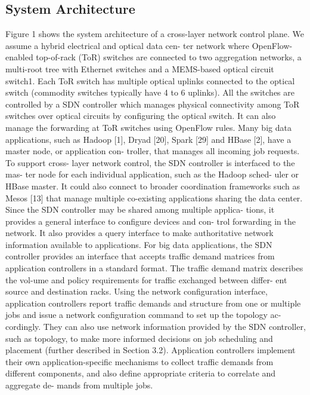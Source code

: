 \documentclass[runningheads,a4paper]{llncs}
\begin{document}
\subsection{System Architecture}
Figure 1 shows the system architecture of a cross-layer network control plane. We assume a hybrid electrical and optical data cen- ter network where OpenFlow-enabled top-of-rack (ToR) switches are connected to two aggregation networks, a multi-root tree with Ethernet switches and a MEMS-based optical circuit switch1. Each ToR switch has multiple optical uplinks connected to the optical switch (commodity switches typically have 4 to 6 uplinks). All the switches are controlled by a SDN controller which manages physical connectivity among ToR switches over optical circuits by configuring the optical switch. It can also manage the forwarding at ToR switches using OpenFlow rules.
Many big data applications, such as Hadoop [1], Dryad [20], Spark [29] and HBase [2], have a master node, or application con- troller, that manages all incoming job requests. To support cross- layer network control, the SDN controller is interfaced to the mas- ter node for each individual application, such as the Hadoop sched- uler or HBase master. It could also connect to broader coordination frameworks such as Mesos [13] that manage multiple co-existing applications sharing the data center.
Since the SDN controller may be shared among multiple applica- tions, it provides a general interface to configure devices and con- trol forwarding in the network. It also provides a query interface to make authoritative network information available to applications. For big data applications, the SDN controller provides an interface that accepts traffic demand matrices from application controllers in a standard format. The traffic demand matrix describes the vol-ume and policy requirements for traffic exchanged between differ- ent source and destination racks.
Using the network configuration interface, application controllers report traffic demands and structure from one or multiple jobs and issue a network configuration command to set up the topology ac- cordingly. They can also use network information provided by the SDN controller, such as topology, to make more informed decisions on job scheduling and placement (further described in Section 3.2). Application controllers implement their own application-specific mechanisms to collect traffic demands from different components, and also define appropriate criteria to correlate and aggregate de- mands from multiple jobs.
\end{document}
